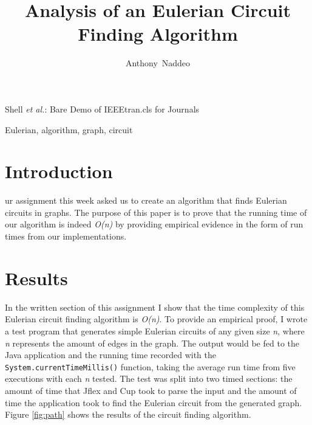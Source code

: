 \documentclass[journal]{IEEEtran}
\begin{document}
\title{Analysis of an Eulerian Circuit Finding Algorithm}
\author{Anthony~Naddeo}%

%
{Shell \MakeLowercase{\textit{et al.}}: Bare Demo of IEEEtran.cls for Journals}

\maketitle

\begin{IEEEkeywords}
Eulerian, algorithm, graph, circuit
\end{IEEEkeywords}





\section{Introduction} 

ur assignment this week asked us to create an algorithm that finds Eulerian circuits in graphs. The purpose of this paper is to prove that the running time of our algorithm is indeed \textit{O(n)} by providing empirical evidence in the form of run times from our implementations. 


\section{Results}

In the written section of this assignment I show that the time complexity of this Eulerian circuit finding algorithm is \textit{O(n)}. To provide an empirical proof, I wrote a test program that generates simple Eulerian circuits of any given size \textit{n}, where \textit{n} represents the amount of edges in the graph. The output would be fed to the Java application and the running time recorded with the \texttt{System.currentTimeMillis()} function, taking the average run time from five executions with each \textit{n} tested. The test was split into two timed sections: the amount of time that Jflex and Cup took to parse the input and the amount of time the application took to find the Eulerian circuit from the generated graph. Figure \ref{fig:path} shows the results of the circuit finding algorithm. 
\end{document}
